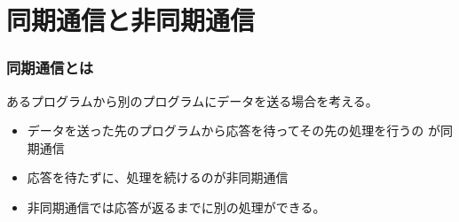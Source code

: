 

\frame{\maketitle}
\section{同期通信と非同期通信}
\begin{frame}[containsverbatim]
 \frametitle{同期通信とは}
 あるプログラムから別のプログラムにデータを送る場合を考える。
 \begin{itemize}
  \item データを送った先のプログラムから応答を待ってその先の処理を行うの
        が同期通信
  \item 応答を待たずに、処理を続けるのが非同期通信
  \item 非同期通信では応答が返るまでに別の処理ができる。
 \end{itemize}
\end{frame}
